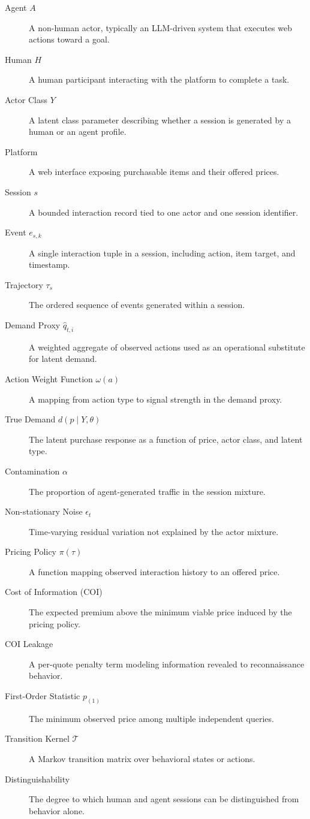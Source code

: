 \documentclass[12pt,letterpaper]{article}
\begin{document}
\begin{description}
\item[Agent $A$] A non-human actor, typically an LLM-driven system that executes web actions toward a goal.
\item[Human $H$] A human participant interacting with the platform to complete a task.
\item[Actor Class $Y$] A latent class parameter describing whether a session is generated by a human or an agent profile.
\item[Platform] A web interface exposing purchasable items and their offered prices.
\item[Session $s$] A bounded interaction record tied to one actor and one session identifier.
\item[Event $e_{s,k}$] A single interaction tuple in a session, including action, item target, and timestamp.
\item[Trajectory $\tau_s$] The ordered sequence of events generated within a session.
\item[Demand Proxy $\hat{q}_{t,i}$] A weighted aggregate of observed actions used as an operational substitute for latent demand.
\item[Action Weight Function $\omega(a)$] A mapping from action type to signal strength in the demand proxy.
\item[True Demand $d(p\mid Y,\theta)$] The latent purchase response as a function of price, actor class, and latent type.
\item[Contamination $\alpha$] The proportion of agent-generated traffic in the session mixture.
\item[Non-stationary Noise $\epsilon_t$] Time-varying residual variation not explained by the actor mixture.
\item[Pricing Policy $\pi(\tau)$] A function mapping observed interaction history to an offered price.
\item[Cost of Information (COI)] The expected premium above the minimum viable price induced by the pricing policy.
\item[COI Leakage] A per-quote penalty term modeling information revealed to reconnaissance behavior.
\item[First-Order Statistic $p_{(1)}$] The minimum observed price among multiple independent queries.
\item[Transition Kernel $\mathcal{T}$] A Markov transition matrix over behavioral states or actions.
\item[Distinguishability] The degree to which human and agent sessions can be distinguished from behavior alone.

\end{description}
\end{document}
